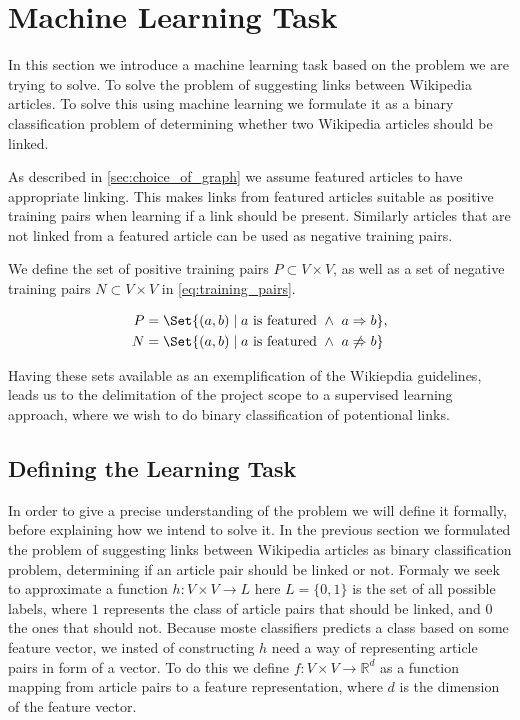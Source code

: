 \section{Machine Learning Task}\label{sec:machine_learning_task}
In this section we introduce a machine learning task based on the problem we are trying to solve. To solve the problem of suggesting links between Wikipedia articles. To solve this using machine learning we formulate it as a binary classification problem of determining whether two Wikipedia articles should be linked.

As described in \cref{sec:choice_of_graph} we assume featured articles to have appropriate linking. This makes links from featured articles suitable as positive training pairs when learning if a link should be present. Similarly articles that are not linked from a featured article can be used as negative training pairs.

We define the set of positive training pairs $P \subset V \times V$, as well as a set of negative training pairs $N \subset V \times V$ in \cref{eq:training_pairs}.

\begin{equation}
\label{eq:training_pairs}
  \begin{split}
    P &= \Set{(a,b) \mid a\text{ is featured}\ \wedge\ a \Rightarrow b}, \\
    N &= \Set{(a,b) \mid a\text{ is featured}\ \wedge\ a \not\Rightarrow b}
  \end{split}
\end{equation}

Having these sets available as an exemplification of the Wikiepdia guidelines, leads us to the delimitation of the project scope to a supervised learning approach, where we wish to do binary classification of potentional links.


\subsection{Defining the Learning Task}
\label{sec:ml_def}
In order to give a precise understanding of the problem we will define it formally, before explaining how we intend to solve it.
In the previous section we formulated the problem of suggesting links between Wikipedia articles as binary classification problem, determining if an article pair should be linked or not. Formaly we seek to approximate a function $h: V \times V \to L$ here $L=\{0,1\}$ is the set of all possible labels, where $1$ represents the class of article pairs that should be linked, and $0$ the ones that should not.
Because moste classifiers predicts a class based on some feature vector, we insted of constructing $h$ need a way of representing article pairs in form of a vector. To do this we define $f: V\times V \to \mathbb{R}^d$ as a function mapping from article pairs to a feature representation, where $d$ is the dimension of the feature vector. 

